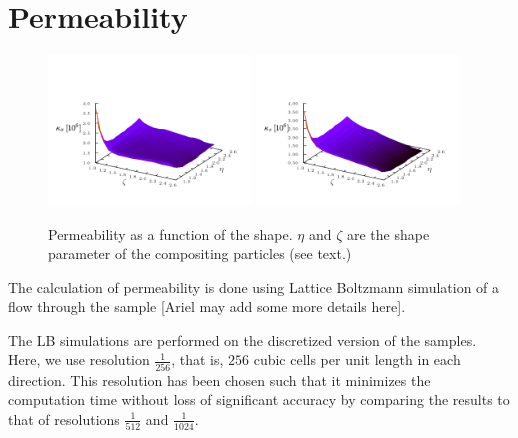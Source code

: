 \documentclass[aps,twocolumn,superscriptaddress,showpacs,showkeys]{revtex4}
\begin{document}
\section{Permeability}
\label{sec:permeability}
\begin{figure}
\begin{center}
\includegraphics*[width=0.48\textwidth,angle=0]{data-figs/permeability_x}
\includegraphics*[width=0.48\textwidth,angle=0]{data-figs/permeability_z}
\caption{\protect
	Permeability as a function of the shape. $\eta$ and $\zeta$ 
	are the shape parameter of the compositing particles (see text.)
	}
\label{fig:perm}
\end{center}
\end{figure}

The calculation of permeability is done using Lattice Boltzmann simulation of a 
flow through the sample [Ariel may add some more details here]. 

The LB simulations are performed on the discretized version of the samples. Here, 
we use resolution $\frac{1}{256}$, that is, $256$ cubic cells per unit length in each direction. 
This resolution has been chosen such that it minimizes the computation time without loss of significant accuracy by 
comparing the results to that of resolutions $\frac{1}{512}$ and $\frac{1}{1024}$.
\end{document}
